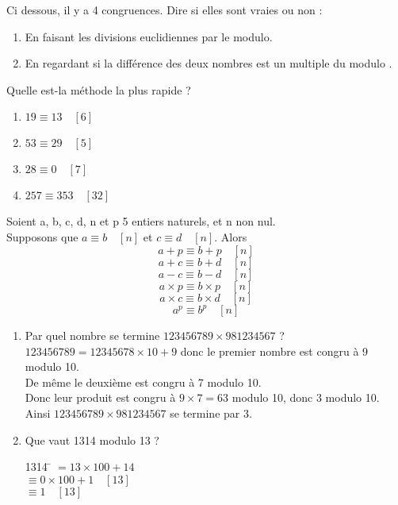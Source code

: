 \documentclass[a4paper,12pt,french]{book}
\begin{document}
\begin{exercice}[]
	Ci dessous, il y a 4 congruences. Dire si elles sont vraies ou non :
	
	\begin{enumerate}[\bfseries 1.]
		\item 	En faisant les \og divisions euclidiennes par le modulo\fg.
		\item 	En regardant si la différence des deux nombres est un \og multiple du modulo \fg.	
	\end{enumerate}
	Quelle est-la méthode la plus rapide ?
	
	\begin{multicols}{4}
		\begin{enumerate}[\bfseries a.]
			\item $19\equiv 13\quad[6]$
			\item $53\equiv 29\quad[5]$
			\item $28\equiv 0 \quad[7]$
			\item $257\equiv 353\quad[32]$
		\end{enumerate}
	\end{multicols}

\end{exercice}


\begin{propriete}
	
	Soient a, b, c, d, n et p 5 entiers naturels, et n non nul.\\
	
	Supposons que $a\equiv b\quad[n]$ et $c\equiv d \quad [n]$. Alors
	$$ a+p \equiv b +p \quad [n]$$	
	$$ a+c \equiv b + d \quad [n]$$	
	$$ a-c \equiv b - d \quad [n]$$
	$$ a\times p \equiv b \times p \quad [n]$$
	$$ a\times c \equiv b \times d \quad [n]$$
	$$ a^p \equiv b^p \quad [n]$$
\end{propriete}

\begin{exemple}[s]
\begin{enumerate}[\bfseries a.]
	\item 		Par quel nombre se termine $123456789\times 981234567$ ?\\
	$123456789=12345678\times 10 +9$ donc le premier nombre est congru à 9 modulo 10.\\
	De même le deuxième est congru à 7 modulo 10.\\
	Donc leur produit est congru à $9\times7=63$ modulo 10, donc 3 modulo 10.\\
	Ainsi $123456789\times 981234567$ se termine par 3.
	\item 	Que vaut 1314 modulo 13 ?\\
			\begin{tabbing}
				1314 	\= $=13\times 100 +14$\\
						\> $\equiv 0\times 100 +1\quad[13]$\\
						\> $\equiv 1\quad [13]$
			\end{tabbing}
\end{enumerate}
\end{exemple}
\end{document}

